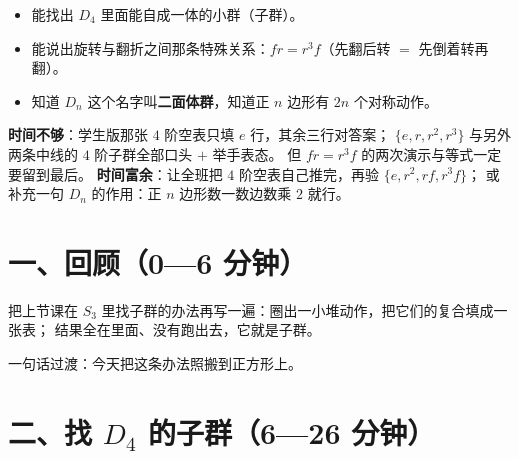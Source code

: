 

\begin{mubiao}
  \begin{itemize}
    \item 能找出 \(D_4\) 里面能自成一体的小群（子群）。
    \item 能说出旋转与翻折之间那条特殊关系：\(fr=r^3f\)（先翻后转 \(=\) 先倒着转再翻）。
    \item 知道 \(D_n\) 这个名字叫\textbf{二面体群}，知道正 \(n\) 边形有 \(2n\) 个对称动作。
  \end{itemize}
\end{mubiao}


\begin{beifen}
  \textbf{时间不够}：学生版那张 \(4\) 阶空表只填 \(e\) 行，其余三行对答案；
  \(\{e,r,r^2,r^3\}\) 与另外两条中线的 \(4\) 阶子群全部口头 \(+\) 举手表态。
  但 \(fr=r^3f\) 的两次演示与等式一定要留到最后。
  \textbf{时间富余}：让全班把 \(4\) 阶空表自己推完，再验 \(\{e,r^2,rf,r^3f\}\)；
  或补充一句 \(D_n\) 的作用：正 \(n\) 边形数一数边数乘 \(2\) 就行。
\end{beifen}

\section*{一、回顾（0—6 分钟）}

把上节课在 \(S_3\) 里找子群的办法再写一遍：圈出一小堆动作，把它们的复合填成一张表；
结果全在里面、没有跑出去，它就是子群。

一句话过渡：今天把这条办法照搬到正方形上。

\section*{二、找 \(D_4\) 的子群（6—26 分钟）}


